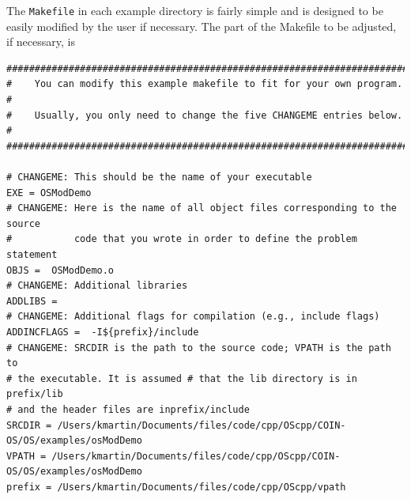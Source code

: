\documentclass[11pt]{article}
\renewcommand{\_}{{\char"5F}}
\renewcommand{\{}{{\char"7B}}
\renewcommand{\}}{{\char"7D}}
\renewcommand{\^}{{\char"0D}}
\renewcommand{\'}{{\char"0D}}
\begin{document}
\begin{enumerate}[Step 1:]
The {\tt Makefile} in each example directory is fairly simple and is designed to be easily modified by the user
if necessary.  The part of the Makefile to be adjusted, if necessary, is
%

\begin{verbatim}
##########################################################################
#    You can modify this example makefile to fit for your own program.   #
#    Usually, you only need to change the five CHANGEME entries below.   #
##########################################################################

# CHANGEME: This should be the name of your executable
EXE = OSModDemo
# CHANGEME: Here is the name of all object files corresponding to the source
#           code that you wrote in order to define the problem statement
OBJS =  OSModDemo.o
# CHANGEME: Additional libraries
ADDLIBS =
# CHANGEME: Additional flags for compilation (e.g., include flags)
ADDINCFLAGS =  -I${prefix}/include
# CHANGEME: SRCDIR is the path to the source code; VPATH is the path to
# the executable. It is assumed # that the lib directory is in prefix/lib
# and the header files are inprefix/include
SRCDIR = /Users/kmartin/Documents/files/code/cpp/OScpp/COIN-OS/OS/examples/osModDemo
VPATH = /Users/kmartin/Documents/files/code/cpp/OScpp/COIN-OS/OS/examples/osModDemo
prefix = /Users/kmartin/Documents/files/code/cpp/OScpp/vpath
\end{verbatim}



\end{enumerate}
\end{document}
